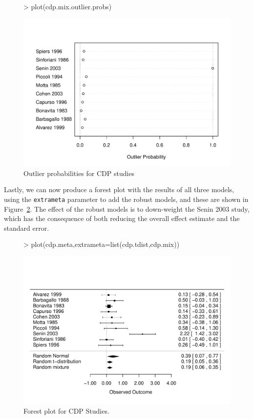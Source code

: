 \documentclass{article}
\begin{document}
\begin{figure}
  \centering
\begin{Schunk}
\begin{Sinput}
> plot(cdp.mix.outlier.probs)
\end{Sinput}
\end{Schunk}
\includegraphics{metaplus-examples-013}
  \caption{Outlier probabilities for CDP studies}
  \label{fig:outliers2}
\end{figure}

Lastly, we can now produce a forest plot with the results of all three models, using the \texttt{extrameta} parameter to add the robust models, and these are shown in Figure~\ref{fig:forest2}. The effect of the robust models is to down-weight the Senin 2003 study, which has the consequence of both reducing the overall effect estimate and the standard error.

\begin{figure}
  \centering
\begin{Schunk}
\begin{Sinput}
> plot(cdp.meta,extrameta=list(cdp.tdist,cdp.mix))
\end{Sinput}
\end{Schunk}
\includegraphics{metaplus-examples-014}
  \caption{Forest plot for CDP Studies.}
  \label{fig:forest2}
\end{figure}
\end{document}
